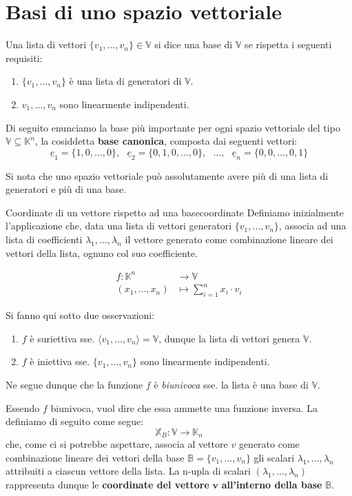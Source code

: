 \documentclass[12pt]{report}
\newcommand{\whitespace}{\text{ }}
\newcommand{\K}{\mathbb{K}}
\newcommand{\V}{\mathbb{V}}
\newcommand{\genericvector}[1]{(#1_1, \dots, #1_n)}
\newcommand{\vectors}[1]{#1_1, \dots, #1_n}
\begin{document}
	\section{Basi di uno spazio vettoriale}
	Una lista di vettori $\{\vectors{v}\} \in \V$ si dice una base di $\V$ se rispetta i seguenti requisiti:
	\begin{enumerate}
		\item $\{\vectors{v}\}$ è una lista di generatori di $\V$.
		\item $\vectors{v}$ sono linearmente indipendenti.
	\end{enumerate}
	Di seguito enunciamo la base più importante per ogni spazio vettoriale del tipo $\V \subseteq \K^n$, la cosiddetta \textbf{base canonica}, composta dai seguenti vettori:
	\[
		\underline{e}_1 = \{1, 0, \dots, 0\}, \whitespace\underline{e}_2 = \{0, 1, 0, \dots, 0\},\whitespace \dots, \whitespace\underline{e}_n = \{0, 0, \dots, 0, 1\}
	\]
	
	Si nota che uno spazio vettoriale può assolutamente avere più di una lista di generatori e più di una base.
	
	\begin{definizione}{Coordinate di un vettore rispetto ad una base}{coordinate}
		Definiamo inizialmente l'applicazione che, data una lista di vettori generatori $\{\vectors{v}\}$, associa ad una lista di coefficienti $\lambda_1, \dots, \lambda_n$ il vettore generato come combinazione lineare dei vettori della lista, ognuno col suo coefficiente.
		
		\[
			\begin{aligned}
				f: \K^n &\to \V\\
				\genericvector{x} &\mapsto \sum_{i=1}^{n} x_i \cdot v_i
			\end{aligned}
		\]
		
		Si fanno qui sotto due osservazioni:
		\begin{enumerate}
			\item $f$ è suriettiva sse. $\langle \vectors{v}\rangle= \V$, dunque la lista di vettori genera $\V$.
			\item $f$ è iniettiva sse. $\{\vectors{v}\}$ sono linearmente indipendenti.
		\end{enumerate}
		Ne segue dunque che la funzione $f$ è \textit{biunivoca} sse. la lista è una base di $\V$.
		
		Essendo $f$ biunivoca, vuol dire che essa ammette una funzione inversa. La definiamo di seguito come segue:
		\[
			\mathbb{X}_B: \V \to \K_n
		\]
		che, come ci si potrebbe aspettare, associa al vettore $v$ generato come combinazione lineare dei vettori della base $\mathbb{B} = \{\vectors{v}\}$ gli scalari $\lambda_1, \dots, \lambda_n$ attribuiti a ciascun vettore della lista.
		La n-upla di scalari $\genericvector{\lambda}$ rappresenta dunque le \textbf{coordinate del vettore} $\mathbf{v}$ \textbf{all'interno della base} $\mathbb{B}$.
	
	\end{definizione}
	
\end{document}
